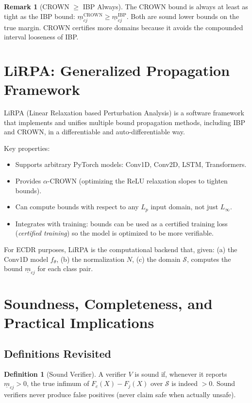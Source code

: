 \documentclass[11pt, a4paper]{article}
\theoremstyle{definition}
\newtheorem{definition}{Definition}[section]
\newtheorem{remark}{Remark}[section]
\theoremstyle{plain}
\newcommand{\mbm}[1]{\underline{m}_{#1}}
\begin{document}
\begin{remark}[CROWN $\ge$ IBP Always]
  The CROWN bound is always at least as tight as the IBP bound:
  $\mbm{cj}^{\text{CROWN}} \ge \mbm{cj}^{\text{IBP}}$.
  Both are sound lower bounds on the true margin. CROWN certifies more domains
  because it avoids the compounded interval looseness of IBP.
\end{remark}

\section{LiRPA: Generalized Propagation Framework}

LiRPA (Linear Relaxation based Perturbation Analysis) is a software framework
that implements and unifies multiple bound propagation methods, including IBP
and CROWN, in a differentiable and auto-differentiable way.

Key properties:
\begin{itemize}[leftmargin=1.5em]
  \item Supports arbitrary PyTorch models: Conv1D, Conv2D, LSTM, Transformers.
  \item Provides $\alpha$-CROWN (optimizing the ReLU relaxation slopes to tighten bounds).
  \item Can compute bounds with respect to any $L_p$ input domain, not just $L_\infty$.
  \item Integrates with training: bounds can be used as a certified training loss
        (\textit{certified training}) so the model is optimized to be more verifiable.
\end{itemize}

For ECDR purposes, LiRPA is the computational backend that, given:
(a) the Conv1D model $f_\theta$,
(b) the normalization $N$,
(c) the domain $\mathcal{S}$,
computes the bound $\mbm{cj}$ for each class pair.

\section{Soundness, Completeness, and Practical Implications}

\subsection{Definitions Revisited}

\begin{definition}[Sound Verifier]
  A verifier $V$ is sound if, whenever it reports $\mbm{cj} > 0$,
  the true infimum of $F_c(X) - F_j(X)$ over $\mathcal{S}$ is indeed $> 0$.
  Sound verifiers never produce false positives (never claim safe when actually unsafe).
\end{definition}
\end{document}
